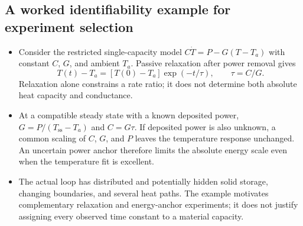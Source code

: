 \subsection{A worked identifiability example for experiment selection}\label{subsec:worked-identifiability-example}
\begin{itemize}[leftmargin=*]
\item Consider the restricted single-capacity model $C\dot T=P-G(T-T_a)$ with constant $C$, $G$, and ambient $T_a$. Passive relaxation after power removal gives
\begin{equation}
T(t)-T_a=[T(0)-T_a]\exp(-t/\tau),\qquad \tau=C/G.
\label{eq:relaxation-example}
\end{equation}
Relaxation alone constrains a rate ratio; it does not determine both absolute heat capacity and conductance.
\item At a compatible steady state with a known deposited power, $G=P/(T_{\mathrm{ss}}-T_a)$ and $C=G\tau$. If deposited power is also unknown, a common scaling of $C$, $G$, and $P$ leaves the temperature response unchanged. An uncertain power anchor therefore limits the absolute energy scale even when the temperature fit is excellent.
\item The actual loop has distributed and potentially hidden solid storage, changing boundaries, and several heat paths. The example motivates complementary relaxation and energy-anchor experiments; it does not justify assigning every observed time constant to a material capacity.\cite{raue2009identifiability}
\end{itemize}

